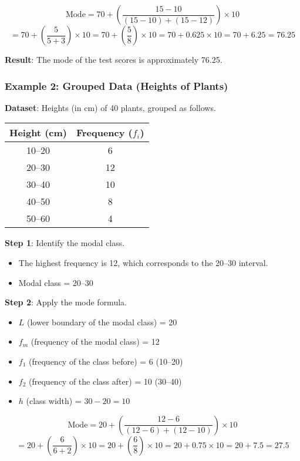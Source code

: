 \documentclass[11pt]{article}
\begin{document}
\[
\text{Mode} = 70 + \left( \frac{15 - 10}{(15 - 10) + (15 - 12)} \right) \times 10
\]
\[
= 70 + \left( \frac{5}{5 + 3} \right) \times 10 = 70 + \left( \frac{5}{8} \right) \times 10 = 70 + 0.625 \times 10 = 70 + 6.25 = 76.25
\]

\textbf{Result}: The mode of the test scores is approximately 76.25.

\subsubsection*{Example 2: Grouped Data (Heights of Plants)}
\textbf{Dataset}: Heights (in cm) of 40 plants, grouped as follows.

\begin{center}
\begin{tabular}{|c|c|}
\hline
\textbf{Height (cm)} & \textbf{Frequency} ($f_i$) \\
\hline
10--20 & 6 \\
20--30 & 12 \\
30--40 & 10 \\
40--50 & 8 \\
50--60 & 4 \\
\hline
\end{tabular}
\end{center}

\textbf{Step 1}: Identify the modal class.
\begin{itemize}
    \item The highest frequency is 12, which corresponds to the 20--30 interval.
    \item Modal class = 20--30
\end{itemize}

\textbf{Step 2}: Apply the mode formula.
\begin{itemize}
    \item $L$ (lower boundary of the modal class) = 20
    \item $f_m$ (frequency of the modal class) = 12
    \item $f_1$ (frequency of the class before) = 6 (10--20)
    \item $f_2$ (frequency of the class after) = 10 (30--40)
    \item $h$ (class width) = $30 - 20 = 10$
\end{itemize}

\[
\text{Mode} = 20 + \left( \frac{12 - 6}{(12 - 6) + (12 - 10)} \right) \times 10
\]
\[
= 20 + \left( \frac{6}{6 + 2} \right) \times 10 = 20 + \left( \frac{6}{8} \right) \times 10 = 20 + 0.75 \times 10 = 20 + 7.5 = 27.5
\]
\end{document}
